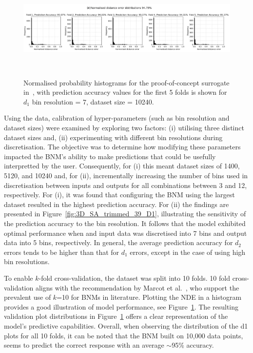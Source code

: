 \documentclass[journal]{IEEEtran}
\begin{document}
\begin{figure}
    \centering
    \includegraphics[width=\textwidth]{figures/validation_plots/PROCESS/st20_d1_7bins_folds.png}
    \caption{\small Normalised probability histograms for the proof-of-concept surrogate in~\cite{Griffiths2024}, with prediction accuracy values for the first 5 folds is shown for $d_{1}$ bin resolution = 7, dataset size = 10240.}~\label{fig:k-foldhistograms}
\end{figure}


Using the data, calibration of hyper-parameters (such as bin resolution and dataset sizes) were examined by exploring two factors: (i) utilising three distinct dataset sizes and, (ii) experimenting with different bin resolutions during discretisation. The objective was to determine how modifying these parameters impacted the BNM's ability to make predictions that could be usefully interpretted by the user. Consequently, for (i) this meant dataset sizes of 1400, 5120, and 10240 and, for (ii), incrementally increasing the number of bins used in discretisation between inputs and outputs for all combinations between 3 and 12, respectively. For (i), it was found that configuring the BNM using the largest dataset resulted in the highest prediction accuracy. For (ii) the findings are presented in Figure~\ref{fig:3D_SA_trimmed_39_D1}, illustrating the sensitivity of the prediction accuracy to the bin resolution. It follows that the model exhibited optimal performance when and input data was discretised into 7 bins and output data into 5 bins, respectively. In general, the average prediction accuracy for $d_{2}$ errors tends to be higher than that for $d_{1}$ errors, except in the case of using high bin resolutions.

To enable $k$-fold cross-validation, the dataset was split into 10 folds. 10 fold cross-validation aligns with the recommendation by Marcot et al.~\cite{Marcot2021}, who support the prevalent use of $k$=10 for BNMs in literature. Plotting the NDE in a histogram provides a good illustration of model performance, see Figure~\ref{fig:k-foldhistograms}. The resulting validation plot distributions in Figure~\ref{fig:k-foldhistograms} offers a clear representation of the model's predictive capabilities. Overall, when observing the distribution of the d1 plots for all 10 folds, it can be noted that the BNM built on 10,000 data points, seems to predict the correct response with an average $\sim$95\% accuracy.
\end{document}

